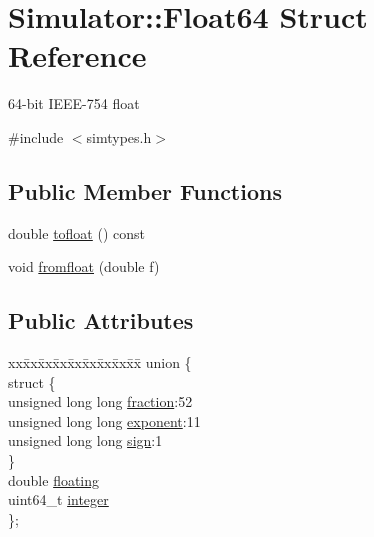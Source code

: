 \hypertarget{struct_simulator_1_1_float64}{\section{Simulator\+:\+:Float64 Struct Reference}
\label{struct_simulator_1_1_float64}
}


64-\/bit I\+E\+E\+E-\/754 float  




{\ttfamily \#include $<$simtypes.\+h$>$}

\subsection*{Public Member Functions}
\begin{DoxyCompactItemize}
\item 
double \hyperlink{struct_simulator_1_1_float64_a4a668513e92383521ea4c3b8b47906a3}{tofloat} () const 
\item 
void \hyperlink{struct_simulator_1_1_float64_a63ee77cc9d8be9d5faa9100995d57ac3}{fromfloat} (double f)
\end{DoxyCompactItemize}
\subsection*{Public Attributes}
\begin{DoxyCompactItemize}
\item 
\begin{tabbing}
xx\=xx\=xx\=xx\=xx\=xx\=xx\=xx\=xx\=\kill
union \{\\
\>struct \{\\
\>\>unsigned long long \hyperlink{struct_simulator_1_1_float64_a6cc3e310e4626f5031dfbe6c41247412}{fraction}:52\\
\>\>unsigned long long \hyperlink{struct_simulator_1_1_float64_a9e24140d5ef2be7741e6b16a2ad49c49}{exponent}:11\\
\>\>unsigned long long \hyperlink{struct_simulator_1_1_float64_a1253dc02adb9798a2b0ea1a5c9d5ba44}{sign}:1\\
\>\} \\
\>double \hyperlink{struct_simulator_1_1_float64_ace414eeac7641e8724ac82a95aad288c}{floating}\\
\>uint64\_t \hyperlink{struct_simulator_1_1_float64_a5f289ccbab79d5a83db374ae64465d12}{integer}\\
\}; \\

\end{tabbing}\end{DoxyCompactItemize}


